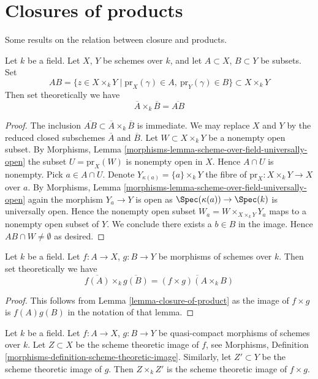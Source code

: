\section{Closures of products}
\label{section-closure-of-products}

\noindent
Some results on the relation between closure and products.

\begin{lemma}
\label{lemma-closure-of-product}
Let $k$ be a field.
Let $X$, $Y$ be schemes over $k$, and let
$A \subset X$, $B \subset Y$ be subsets.
Set
$$
AB =
\{z \in X \times_k Y \mid
\text{pr}_X(\gamma) \in A, \ \text{pr}_Y(\gamma) \in B\}
\subset X \times_k Y
$$
Then set theoretically we have
$$
\overline{A} \times_k \overline{B} = \overline{AB}
$$
\end{lemma}

\begin{proof}
The inclusion $\overline{AB} \subset \overline{A} \times_k \overline{B}$
is immediate.
We may replace $X$ and $Y$ by the reduced closed subschemes $\overline{A}$
and $\overline{B}$.
Let $W \subset X \times_k Y$ be a nonempty open subset. By
Morphisms, Lemma \ref{morphisms-lemma-scheme-over-field-universally-open}
the subset $U = \text{pr}_X(W)$ is nonempty open in $X$.
Hence $A \cap U$ is nonempty. Pick $a \in A \cap U$.
Denote $Y_{\kappa(a)} = \{a\} \times_k Y$
the fibre of $\text{pr}_X : X \times_k Y \to X$ over $a$. By
Morphisms, Lemma \ref{morphisms-lemma-scheme-over-field-universally-open}
again the morphism $Y_a \to Y$ is open as
$\Spec(\kappa(a)) \to \Spec(k)$ is universally open.
Hence the nonempty open
subset $W_a = W \times_{X \times_k Y} Y_a$
maps to a nonempty open subset of $Y$.
We conclude there exists a $b \in B$ in the image.
Hence $AB \cap W \not = \emptyset$ as desired.
\end{proof}

\begin{lemma}
\label{lemma-closure-image-product-map}
Let $k$ be a field.
Let $f : A \to X$, $g : B \to Y$ be morphisms of schemes over $k$.
Then set theoretically we have
$$
\overline{f(A)} \times_k \overline{g(B)} =
\overline{(f \times g)(A \times_k B)}
$$
\end{lemma}

\begin{proof}
This follows from
Lemma \ref{lemma-closure-of-product}
as the image of $f \times g$ is $f(A)g(B)$
in the notation of that lemma.
\end{proof}

\begin{lemma}
\label{lemma-scheme-theoretic-image-product-map}
Let $k$ be a field.
Let $f : A \to X$, $g : B \to Y$ be quasi-compact morphisms of schemes
over $k$. Let $Z \subset X$ be the scheme theoretic image of $f$, see
Morphisms, Definition \ref{morphisms-definition-scheme-theoretic-image}.
Similarly, let $Z' \subset Y$ be the scheme theoretic image of $g$.
Then $Z \times_k Z'$ is the scheme theoretic image of $f \times g$.
\end{lemma}

